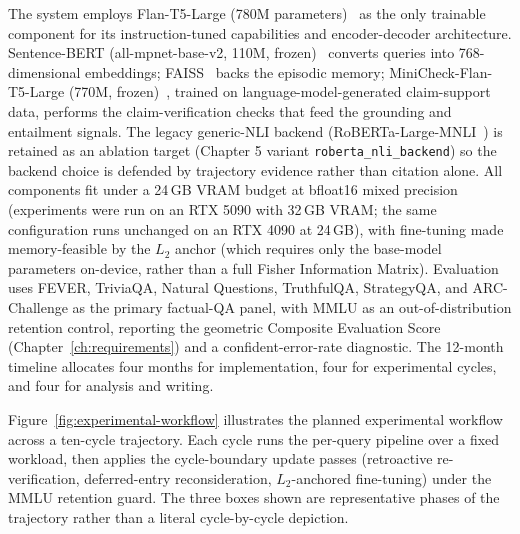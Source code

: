The system employs Flan-T5-Large (780M parameters)~\cite{JMLR:v25:23-0870} as the only trainable component for its instruction-tuned capabilities and encoder-decoder architecture. Sentence-BERT (all-mpnet-base-v2, 110M, frozen)~\cite{reimers-gurevych-2019-sentence} converts queries into 768-dimensional embeddings; FAISS~\cite{8733051} backs the episodic memory; MiniCheck-Flan-T5-Large (770M, frozen)~\cite{tang2024minicheck}, trained on language-model-generated claim-support data, performs the claim-verification checks that feed the grounding and entailment signals. The legacy generic-NLI backend (RoBERTa-Large-MNLI~\cite{liu2019roberta}) is retained as an ablation target (Chapter 5 variant \texttt{roberta\_nli\_backend}) so the backend choice is defended by trajectory evidence rather than citation alone. All components fit under a 24\,GB VRAM budget at bfloat16 mixed precision (experiments were run on an RTX 5090 with 32\,GB VRAM; the same configuration runs unchanged on an RTX 4090 at 24\,GB), with fine-tuning made memory-feasible by the $L_2$ anchor (which requires only the base-model parameters on-device, rather than a full Fisher Information Matrix). Evaluation uses FEVER, TriviaQA, Natural Questions, TruthfulQA, StrategyQA, and ARC-Challenge as the primary factual-QA panel, with MMLU as an out-of-distribution retention control, reporting the geometric Composite Evaluation Score (Chapter~\ref{ch:requirements}) and a confident-error-rate diagnostic. The 12-month timeline allocates four months for implementation, four for experimental cycles, and four for analysis and writing.

Figure~\ref{fig:experimental-workflow} illustrates the planned experimental workflow across a ten-cycle trajectory. Each cycle runs the per-query pipeline over a fixed workload, then applies the cycle-boundary update passes (retroactive re-verification, deferred-entry reconsideration, $L_2$-anchored fine-tuning) under the MMLU retention guard. The three boxes shown are representative phases of the trajectory rather than a literal cycle-by-cycle depiction.

